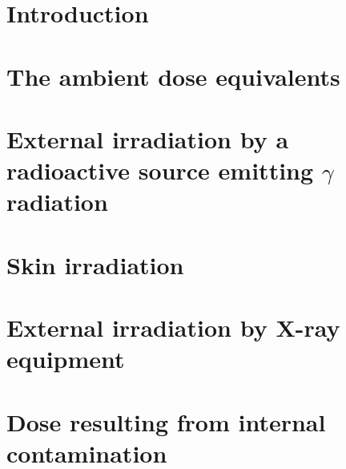 \section{Introduction}
\section{The ambient dose equivalents}
\section{External irradiation by a radioactive source emitting $\gamma$ radiation}
\section{Skin irradiation}
\section{External irradiation by X-ray equipment}
\section{Dose resulting from internal contamination}
